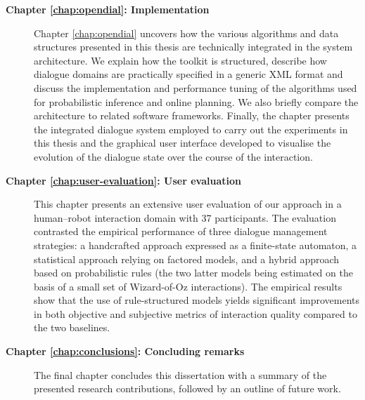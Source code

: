\begin{description}
\item [\textbf{Chapter \ref{chap:opendial}: Implementation}] \hfill  \vspace{2mm}

Chapter \ref{chap:opendial} uncovers how the various algorithms and data structures presented in this thesis are technically integrated in the system architecture.  We explain how the \opendial{} toolkit is structured, describe how dialogue domains are practically specified in a generic XML format and discuss the implementation and performance tuning of the algorithms used for probabilistic inference and online planning.  We also briefly compare the \opendial{} architecture to related software frameworks.  Finally, the chapter presents the integrated dialogue system employed to carry out the experiments in this thesis and the graphical user interface developed to visualise the evolution of the dialogue state over the course of the interaction. 

\item [\textbf{Chapter \ref{chap:user-evaluation}: User evaluation}] \hfill  \vspace{2mm}

This chapter presents an extensive user evaluation of our approach in a human--robot interaction domain with 37 participants.  The evaluation contrasted the empirical performance of three dialogue management strategies: a handcrafted approach expressed as a finite-state automaton, a statistical approach relying on factored models, and a hybrid approach based on probabilistic rules (the two latter models being estimated on the basis of a small set of Wizard-of-Oz interactions).  The empirical results show that the use of rule-structured models yields significant improvements in both objective and subjective metrics of interaction quality compared to the two baselines. \vspace{2mm}


\item [\textbf{Chapter \ref{chap:conclusions}: Concluding remarks}] \hfill  \vspace{2mm}

The final chapter concludes this dissertation with a summary of the presented research contributions, followed by an outline of future work.   \vspace{2mm}

\end{description}

